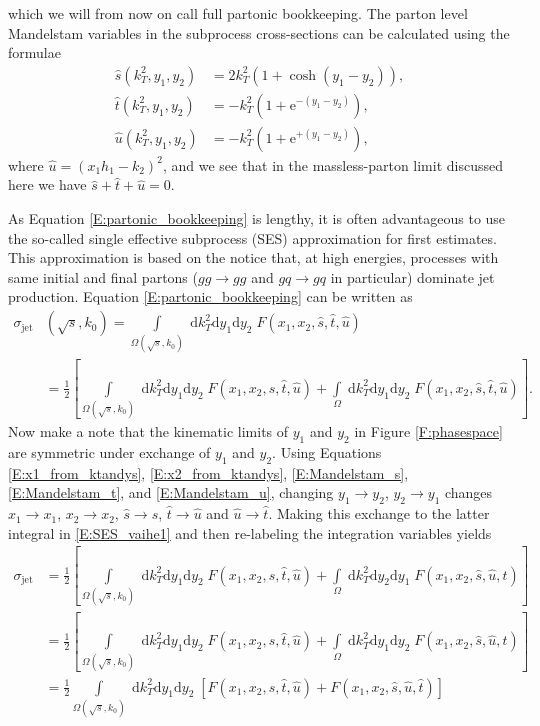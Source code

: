 \documentclass[a4paper, twoside, english, 12pt]{report}
\begin{document}
which we will from now on call full partonic bookkeeping. The parton level Mandelstam variables in the subprocess cross-sections can be calculated using the formulae \cite{pqcd} 
\begin{align}
\hat{s}(k_T^2,y_1,y_2) &= 2k_T^2(1+\cosh(y_1-y_2)), \label{E:Mandelstam_s}\\
\hat{t}(k_T^2,y_1,y_2) &= -k_T^2(1+\text{e}^{-(y_1-y_2)}),\label{E:Mandelstam_t}\\
\hat{u}(k_T^2,y_1,y_2) &=  -k_T^2(1+\text{e}^{+(y_1-y_2)}), \label{E:Mandelstam_u}
\end{align}
where $\hat{u} = (x_1h_1-k_2)^2$, and we see that in the massless-parton limit discussed here we have $\hat{s}+\hat{t}+\hat{u}=0$.

As Equation \eqref{E:partonic_bookkeeping} is lengthy, it is often advantageous to use the so-called single effective subprocess (SES) approximation \cite{pqcd, kjeold, combrses,ESW} for first estimates. This approximation is based on the notice that, at high energies, processes with same initial and final partons ($gg\rightarrow gg$ and $gq\rightarrow gq$ in particular) dominate jet production. Equation \eqref{E:partonic_bookkeeping} can be written as 
\begin{align}
	\sigma_{\text{jet}}&(\sqrt{s},k_0) = \int\limits_{\Omega(\sqrt{s},k_0)}\;\text{d}k_T^2\text{d}y_1\text{d}y_2\; F(x_1,x_2,\hat{s},\hat{t},\hat{u}) \nonumber \\[1em]
	&= \frac{1}{2}\left[\int\limits_{\Omega(\sqrt{s},k_0)}\;\text{d}k_T^2\text{d}y_1\text{d}y_2\; F(x_1,x_2,\hat{s},\hat{t},\hat{u})+\int\limits_{\Omega}\;\text{d}k_T^2\text{d}y_1\text{d}y_2\; F(x_1,x_2,\hat{s},\hat{t},\hat{u})\right]. \label{E:SES_vaihe1}
\end{align}
Now make a note that the kinematic limits of $y_1$ and $y_2$ in Figure \ref{F:phasespace} are symmetric under exchange of $y_1$ and $y_2$. Using Equations \eqref{E:x1_from_ktandys}, \eqref{E:x2_from_ktandys}, \eqref{E:Mandelstam_s}, \eqref{E:Mandelstam_t}, and \eqref{E:Mandelstam_u}, changing $y_1 \rightarrow y_2$, $y_2 \rightarrow y_1$ changes $x_1 \rightarrow x_1$, $x_2 \rightarrow x_2$, $\hat{s}\rightarrow \hat{s}$, $\hat{t}\rightarrow \hat{u}$ and $\hat{u}\rightarrow \hat{t}$. Making this exchange to the latter integral in \eqref{E:SES_vaihe1} and then re-labeling the integration variables yields
\begin{align}
\sigma_{\text{jet}} &= \frac{1}{2}\left[\int\limits_{\Omega(\sqrt{s},k_0)}\;\text{d}k_T^2\text{d}y_1\text{d}y_2\; F(x_1,x_2,\hat{s},\hat{t},\hat{u})+\int\limits_{\Omega}\;\text{d}k_T^2\text{d}y_2\text{d}y_1\; F(x_1,x_2,\hat{s},\hat{u},\hat{t})\right] \nonumber \\[1em]
&= \frac{1}{2}\left[\int\limits_{\Omega(\sqrt{s},k_0)}\;\text{d}k_T^2\text{d}y_1\text{d}y_2\; F(x_1,x_2,\hat{s},\hat{t},\hat{u})+\int\limits_{\Omega}\;\text{d}k_T^2\text{d}y_1\text{d}y_2\; F(x_1,x_2,\hat{s},\hat{u},\hat{t})\right] \nonumber \\[1em]
&= \frac{1}{2}\int\limits_{\Omega(\sqrt{s},k_0)}\;\text{d}k_T^2\text{d}y_1\text{d}y_2\; \left[F(x_1,x_2,\hat{s},\hat{t},\hat{u})+ F(x_1,x_2,\hat{s},\hat{u},\hat{t})\right] \nonumber
\end{align}
\end{document}

